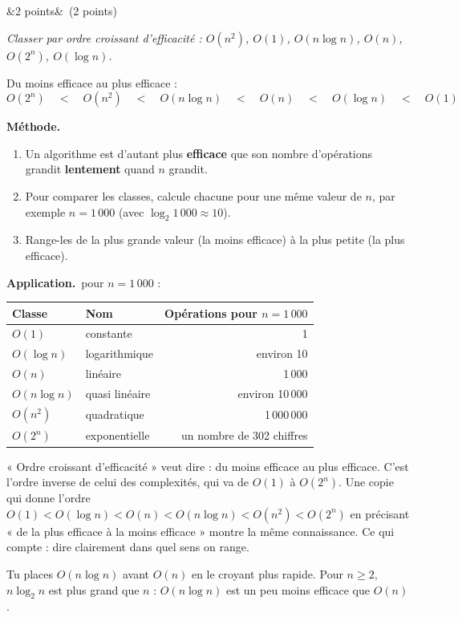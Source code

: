 \documentclass[11pt, a4paper]{exam}
\newcommand{\Q}[3]{\par\needspace{5\baselineskip}\bigskip\noindent{\large\bfseries Question #1}\ifx&#2&\else\ \textnormal{(#2)}\fi\par\nopagebreak\smallskip\noindent\textit{#3}\par\nopagebreak\smallskip}
\newcommand{\methode}{\par\noindent\textbf{Méthode.}\ }
\newcommand{\application}{\par\noindent\textbf{Application.}\ }
\begin{document}
\Q{1 (a)}{2 points}{Classer par ordre croissant d'efficacité : $O(n^2)$, $O(1)$, $O(n \log n)$, $O(n)$, $O(2^n)$, $O(\log n)$.}
\begin{reponse}
Du moins efficace au plus efficace :
\[ O(2^n) \quad < \quad O(n^2) \quad < \quad O(n \log n) \quad < \quad O(n) \quad < \quad O(\log n) \quad < \quad O(1) \]
\end{reponse}
\methode
\begin{enumerate}
\item Un algorithme est d'autant plus \textbf{efficace} que son nombre d'opérations grandit \textbf{lentement} quand $n$ grandit.
\item Pour comparer les classes, calcule chacune pour une même valeur de $n$, par exemple $n = 1\,000$ (avec $\log_2 1\,000 \approx 10$).
\item Range-les de la plus grande valeur (la moins efficace) à la plus petite (la plus efficace).
\end{enumerate}
\application pour $n = 1\,000$ :
\begin{center}
\renewcommand{\arraystretch}{1.2}
\begin{tabular}{|l|l|r|}
\hline
\textbf{Classe} & \textbf{Nom} & \textbf{Opérations pour $n = 1\,000$} \\ \hline
$O(1)$ & constante & 1 \\
$O(\log n)$ & logarithmique & environ 10 \\
$O(n)$ & linéaire & 1\,000 \\
$O(n \log n)$ & quasi linéaire & environ 10\,000 \\
$O(n^2)$ & quadratique & 1\,000\,000 \\
$O(2^n)$ & exponentielle & un nombre de 302 chiffres \\ \hline
\end{tabular}
\end{center}
\begin{remarque}
« Ordre croissant d'efficacité » veut dire : du moins efficace au plus efficace. C'est l'ordre inverse de celui des complexités, qui va de $O(1)$ à $O(2^n)$. Une copie qui donne l'ordre $O(1) < O(\log n) < O(n) < O(n \log n) < O(n^2) < O(2^n)$ en précisant « de la plus efficace à la moins efficace » montre la même connaissance. Ce qui compte : dire clairement dans quel sens on range.
\end{remarque}
\begin{erreur}
Tu places $O(n \log n)$ avant $O(n)$ en le croyant plus rapide. Pour $n \geq 2$, $n \log_2 n$ est plus grand que $n$ : $O(n \log n)$ est un peu moins efficace que $O(n)$.
\end{erreur}
\end{document}
